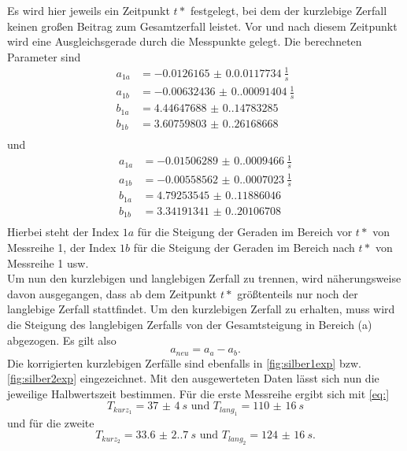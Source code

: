 Es wird hier jeweils ein Zeitpunkt $t*$ festgelegt, bei dem der kurzlebige Zerfall keinen großen Beitrag zum Gesamtzerfall leistet. Vor und nach diesem Zeitpunkt wird 
eine Ausgleichsgerade durch die Messpunkte gelegt. Die berechneten Parameter sind
\begin{align*}
  a_{1a} &= \SI{-0.0126165(0.00117734)}{\frac{1}{s}}\\
  a_{1b} &= \SI{-0.00632436(0.00091404)}{\frac{1}{s}}\\
  b_{1a} &= \SI{4.44647688(0.14783285)}{}\\
  b_{1b} &= \SI{3.60759803(0.26168668)}{}\\
\end{align*}
und 
\begin{align*}
  a_{1a} &= \SI{-0.01506289(0.0009466)}{\frac{1}{s}}\\
  a_{1b} &= \SI{-0.00558562(0.0007023)}{\frac{1}{s}}\\
  b_{1a} &= \SI{4.79253545(0.11886046)}{}\\
  b_{1b} &= \SI{3.34191341(0.20106708)}{}\\
\end{align*}
Hierbei steht der Index $1a$ für die Steigung der Geraden im Bereich vor $t*$ von Messreihe 1, der Index $1b$ für die Steigung der Geraden im Bereich nach $t*$ von Messreihe 1
usw.\\
Um nun den kurzlebigen und langlebigen Zerfall zu trennen, wird näherungsweise davon ausgegangen, dass ab dem Zeitpunkt $t*$ größtenteils nur noch der langlebige Zerfall 
stattfindet. Um den kurzlebigen Zerfall zu erhalten, muss wird die Steigung des langlebigen Zerfalls von der Gesamtsteigung in Bereich (a) abgezogen. Es gilt also 
\begin{equation*}
  a_{neu} = a_{a} - a_{b}.
\end{equation*}
Die korrigierten kurzlebigen Zerfälle sind ebenfalls in \autoref{fig:silber1exp} bzw. \autoref{fig:silber2exp} eingezeichnet.
Mit den ausgewerteten Daten lässt sich nun die jeweilige Halbwertszeit bestimmen.
Für die erste Messreihe ergibt sich mit \autoref{eq:}
\begin{equation*}
  T_{kurz_{1}} = \SI{37(4)}{s} \text{ und } T_{lang_{1}} = \SI{110(16)}{s} 
\end{equation*}
und für die zweite
\begin{equation*}
  T_{kurz_{2}} = \SI{33.6(2.7)}{s} \text{ und } T_{lang_{2}} = \SI{124(16)}{s}.
\end{equation*}
